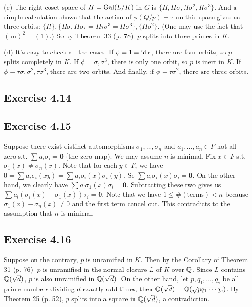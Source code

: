 \documentclass[../Marcus.tex]{subfiles}
\begin{document}
(c) The right coset space of $H=\operatorname{Gal}(L/K)$ in $G$ is $\{H,H\sigma,H\sigma^2,H\sigma^3\}$. And a simple calculation shows that the action of $\phi(Q/p)=\tau$ on this space gives us three orbits: $\{H\},\{H\sigma,H\sigma\tau=H\tau\sigma^3=H\sigma^3\},\{H\sigma^2\}$. (One may use the fact that $(\tau\sigma)^2=(1)$.) So by Theorem 33 (p. 78), $p$ splits into three primes in $K$.

(d) It's easy to check all the cases. If $\phi=1=\operatorname{id}_L$, there are four orbits, so $p$ splits completely in $K$. If $\phi=\sigma,\sigma^3$, there is only one orbit, so $p$ is inert in $K$. If $\phi=\tau\sigma,\sigma^2,\tau\sigma^3$, there are two orbits. And finally, if $\phi=\tau\sigma^2$, there are three orbits.

\subsection*{Exercise 4.14}

\subsection*{Exercise 4.15}

Suppose there exist distinct automorphisms $\sigma_1,\ldots,\sigma_n$ and $a_1,\ldots,a_n\in F$ not all zero s.t. $\sum a_i\sigma_i = \mathbf{0}$ (the zero map). We may assume $n$ is minimal. Fix $x\in F$ s.t. $\sigma_1(x)\neq\sigma_n(x)$. Note that for each $y\in F$, we have $0 = \sum a_i\sigma_i(xy) = \sum a_i\sigma_i(x)\sigma_i(y)$. So $\sum a_i\sigma_i(x)\sigma_i=\mathbf{0}$. On the other hand, we clearly have $\sum a_i\sigma_1(x)\sigma_i=\mathbf{0}$. Subtracting these two gives us $\sum a_i(\sigma_i(x)-\sigma_1(x))\sigma_i=\mathbf{0}$. Note that we have $1\leq\#(\text{terms})<n$ because $\sigma_1(x)-\sigma_n(x)\neq 0$ and the first term cancel out. This contradicts to the assumption that $n$ is minimal.

\subsection*{Exercise 4.16}

Suppose on the contrary, $p$ is unramified in $K$. Then by the Corollary of Theorem 31 (p. 76), $p$ is unramified in the normal closure $L$ of $K$ over $\mathbb{Q}$. Since $L$ contains $\mathbb{Q}(\sqrt{d})$, $p$ is also unramified in $\mathbb{Q}(\sqrt{d})$. On the other hand, let $p,q_1,\ldots,q_s$ be all prime numbers dividing $d$ exactly odd times, then $\mathbb{Q}(\sqrt{d})=\mathbb{Q}(\sqrt{pq_1\cdots q_s})$. By Theorem 25 (p. 52), $p$ splits into a square in $\mathbb{Q}(\sqrt{d})$, a contradiction.
\end{document}
